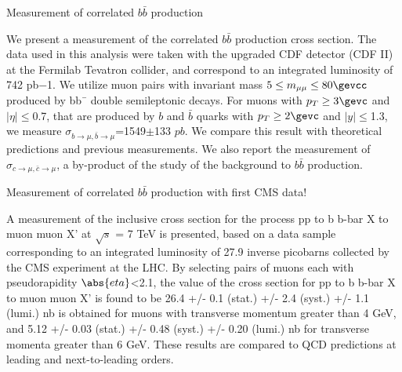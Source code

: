 \begin{MyArticle}[enhanced, tikz={rotate=0}]{Measurement of correlated
    $b\bar{b}$ production}
  \begin{multicols}{2}
    We present a measurement of the correlated $b\bar{b}$ production cross
    section. The data used in this analysis were taken with the upgraded
    CDF detector (CDF II) at the Fermilab Tevatron collider, and
    correspond to an integrated luminosity of 742 pb−1. We utilize muon
    pairs with invariant mass $5 \leq m_{\mu\mu} \leq 80 \gevcc$
    produced by bb¯ double semileptonic decays. For muons with
    $p_T \geq 3 \gevc$ and $|\eta| \le $0.7, that are produced by $b$
    and $\bar{b}$ quarks with $p_T \geq 2 \gevc$ and $|y|\le$1.3, we
    measure $\sigma_{b\rightarrow \mu, \bar{b} \rightarrow
      \mu}$=1549$\pm$133 $pb$.
    We compare this result with theoretical predictions and previous
    measurements.
    We also report the measurement of $\sigma_{c\rightarrow \mu, \bar{c}\rightarrow \mu}$, a by-product of the study of the background to $b\bar{b}$ production.  
  \end{multicols}
\end{MyArticle}

\begin{MyArticle}[enhanced, tikz={rotate=0}]{Measurement of correlated $b\bar{b}$ production with first CMS data!}
  \begin{multicols}{2}
    A measurement of the inclusive cross section for the process pp to b b-bar X to muon muon X' at $\sqrt{s}$ = 7 TeV is presented, based on a data sample corresponding to an integrated luminosity of 27.9 inverse picobarns collected by the CMS experiment at the LHC. By selecting pairs of muons each with pseudorapidity $\abs{eta}$<2.1, the value of the cross section for pp to b b-bar X to muon muon X' is found to be 26.4 +/- 0.1 (stat.) +/- 2.4 (syst.) +/- 1.1 (lumi.) nb is obtained for muons with transverse momentum greater than 4 GeV, and 5.12 +/- 0.03 (stat.) +/- 0.48 (syst.) +/- 0.20 (lumi.) nb for transverse momenta greater than 6 GeV. These results are compared to QCD predictions at leading and next-to-leading orders.
  \end{multicols}
\end{MyArticle}
